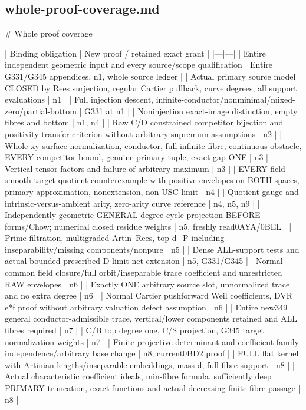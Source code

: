\documentclass[11pt]{article}
\begin{document}
\subsection*{whole-proof-coverage.md}
\begin{GrantData}
# Whole proof coverage

| Binding obligation | New proof / retained exact grant |
|---|---|
| Entire independent geometric input and every source/scope qualification | Entire G331/G345 appendices, n1, whole source ledger |
| Actual primary source model CLOSED by Rees surjection, regular Cartier pullback, curve degrees, all support evaluations | n1 |
| Full injection descent, infinite-conductor/nonminimal/mixed-zero/partial-bottom | G331 at n1 |
| Noninjection exact-image distinction, empty fibres and bottom | n1, n4 |
| Raw C/D constrained competitor bijection and positivity-transfer criterion without arbitrary supremum assumptions | n2 |
| Whole xy-surface normalization, conductor, full infinite fibre, continuous obstacle, EVERY competitor bound, genuine primary tuple, exact gap ONE | n3 |
| Vertical tensor factors and failure of arbitrary maximum | n3 |
| EVERY-field smooth-target quotient counterexample with positive envelopes on BOTH spaces, primary approximation, nonextension, non-USC limit | n4 |
| Quotient gauge and intrinsic-versus-ambient arity, zero-arity curve reference | n4, n5, n9 |
| Independently geometric GENERAL-degree cycle projection BEFORE forms/Chow; numerical closed residue weights | n5, freshly read0AYA/0BEL |
| Prime filtration, multigraded Artin--Rees, top d_P including inseparability/missing components/nonpure | n5 |
| Dense ALL-support tests and actual bounded prescribed-D-limit net extension | n5, G331/G345 |
| Normal common field closure/full orbit/inseparable trace coefficient and unrestricted RAW envelopes | n6 |
| Exactly ONE arbitrary source slot, unnormalized trace and no extra degree | n6 |
| Normal Cartier pushforward Weil coefficients, DVR e*f proof without arbitrary valuation defect assumption | n6 |
| Entire new349 general conductor-admissible trace, vertical/lower components retained and ALL fibres required | n7 |
| C/B top degree one, C/S projection, G345 target normalization weights | n7 |
| Finite projective determinant and coefficient-family independence/arbitrary base change | n8; current0BD2 proof |
| FULL flat kernel with Artinian lengths/inseparable embeddings, mass d, full fibre support | n8 |
| Actual characteristic coefficient ideals, min-fibre formula, sufficiently deep PRIMARY truncation, exact functions and actual decreasing finite-fibre passage | n8 |

\end{GrantData}
\end{document}
